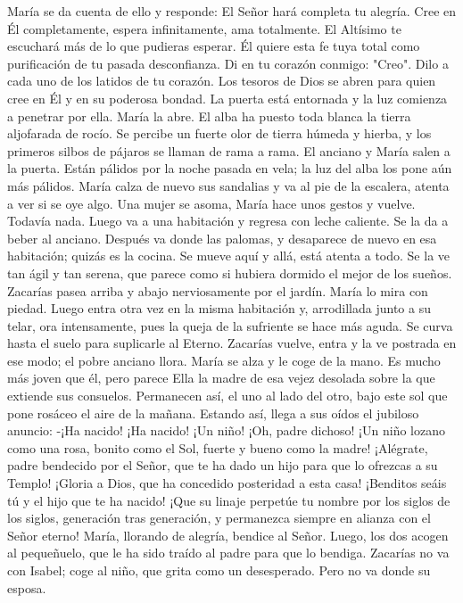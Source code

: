 \documentclass[12pt]{book} %
\begin{document}
María se da cuenta de ello y responde: 
El Señor hará completa tu alegría. Cree en Él completamente, espera infinitamente, ama totalmente. El Altísimo te escuchará más de lo que pudieras esperar. Él quiere esta fe tuya total como purificación de tu pasada desconfianza. Di en tu corazón conmigo: "Creo". Dilo a cada uno de los latidos de tu corazón. Los tesoros de Dios se abren para quien cree en Él y en su poderosa bondad. 
La puerta está entornada y la luz comienza a penetrar por ella. María la abre. El alba ha puesto toda blanca la tierra 
aljofarada de rocío. Se percibe un fuerte olor de tierra húmeda y hierba, y los primeros silbos de pájaros se llaman de rama a rama. 
El anciano y María salen a la puerta. Están pálidos por la noche pasada en vela; la luz del alba los pone aún más pálidos. María calza de nuevo sus sandalias y va al pie de la escalera, atenta a ver si se oye algo. Una mujer se asoma, María hace unos gestos y vuelve. Todavía nada. 
Luego va a una habitación y regresa con leche caliente. Se la da a beber al anciano. Después va donde las palomas, y 
desaparece de nuevo en esa habitación; quizás es la cocina. Se mueve aquí y allá, está atenta a todo. Se la ve tan ágil y tan serena, que parece como si hubiera dormido el mejor de los sueños. 
Zacarías pasea arriba y abajo nerviosamente por el jardín. María lo mira con piedad. Luego entra otra vez en la misma 
habitación y, arrodillada junto a su telar, ora intensamente, pues la queja de la sufriente se hace más aguda. Se curva hasta el suelo para suplicarle al Eterno. Zacarías vuelve, entra y la ve postrada en ese modo; el pobre anciano llora. María se alza y le coge de la mano. Es mucho más joven que él, pero parece Ella la madre de esa vejez desolada sobre la que extiende sus consuelos. 
Permanecen así, el uno al lado del otro, bajo este sol que pone rosáceo el aire de la mañana. Estando así, llega a sus 
oídos el jubiloso anuncio: 
-¡Ha nacido! ¡Ha nacido! ¡Un niño! ¡Oh, padre dichoso! ¡Un niño lozano como una rosa, bonito como el Sol, fuerte y 
bueno como la madre! ¡Alégrate, padre bendecido por el Señor, que te ha dado un hijo para que lo ofrezcas a su Templo! ¡Gloria a Dios, que ha concedido posteridad a esta casa! ¡Benditos seáis tú y el hijo que te ha nacido! ¡Que su linaje perpetúe tu nombre por los siglos de los siglos, generación tras generación, y permanezca siempre en alianza con el Señor eterno! 
María, llorando de alegría, bendice al Señor. Luego, los dos acogen al pequeñuelo, que le ha sido traído al padre para 
que lo bendiga. Zacarías no va con Isabel; coge al niño, que grita como un desesperado. Pero no va donde su esposa. 
\end{document}
